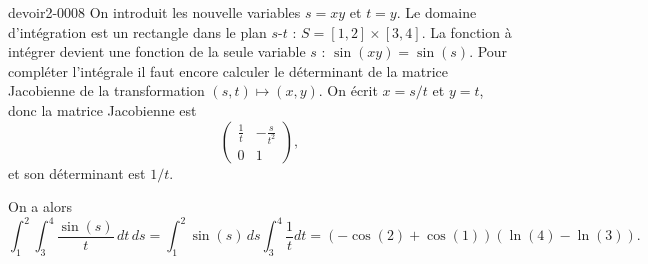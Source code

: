 \begin{corrige}{devoir2-0008}
On introduit les nouvelle variables $s=xy$ et $t=y$. Le domaine d'intégration est un rectangle dans le plan $s$-$t$ : $S= [1,2]\times [3,4]$. La fonction à intégrer devient une fonction de la seule variable $s$ : $\sin(xy)=\sin(s)$. Pour compléter l'intégrale il faut encore calculer le déterminant de la matrice Jacobienne de la transformation $(s,t)\mapsto(x,y)$. On écrit $x=s/t$ et $y=t$, donc la matrice Jacobienne est 
\begin{equation}
  \begin{pmatrix}
    \frac{1}{t} & -\frac{s}{t^2}\\
    0 & 1
  \end{pmatrix},
\end{equation}
  et son déterminant est $1/t$. 

On a alors 
\begin{equation}
  \int_1^2\int_3^ 4\frac{\sin(s)}{t}\, dt\, ds=  \int_1^2\sin(s)\,ds\int_3^ 4 \frac{1}{t}dt = \left(-\cos(2)+ \cos(1)\right)\left(\ln(4)-\ln(3)\right).
\end{equation}

\end{corrige}
